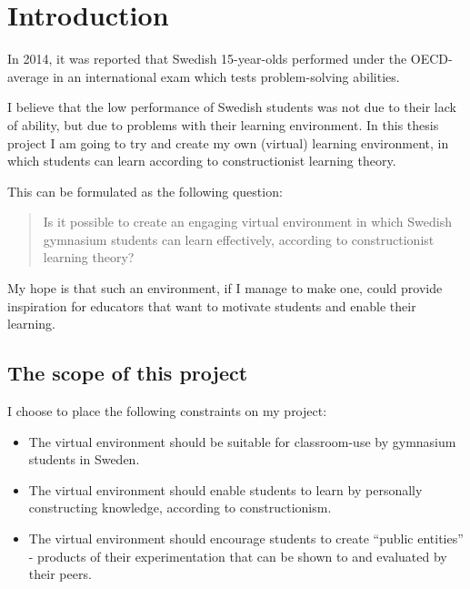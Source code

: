 \section{Introduction}

In 2014, it was reported that Swedish 15-year-olds performed under the OECD-average in an international exam which tests problem-solving abilities\cite{skolverket:pisa}.

I believe that the low performance of Swedish students was not due to their lack of ability, but due to problems with their learning environment. In this thesis project I am going to try and create my own (virtual) learning environment, in which students can learn according to constructionist learning theory.

This can be formulated as the following question:
\begin{quote}
Is it possible to create an engaging virtual environment in which Swedish gymnasium students can learn effectively, according to constructionist learning theory?
\end{quote}

My hope is that such an environment, if I manage to make one, could provide inspiration for educators that want to motivate students and enable their learning. 

\subsection{The scope of this project}

I choose to place the following constraints on my project:
\begin{itemize}
  \item The virtual environment should be suitable for classroom-use by gymnasium students in Sweden.
  \item The virtual environment should enable students to learn by personally constructing knowledge, according to constructionism.
  \item The virtual environment should encourage students to create ``public entities'' - products of their experimentation that can be shown to and evaluated by their peers.
\end{itemize}
